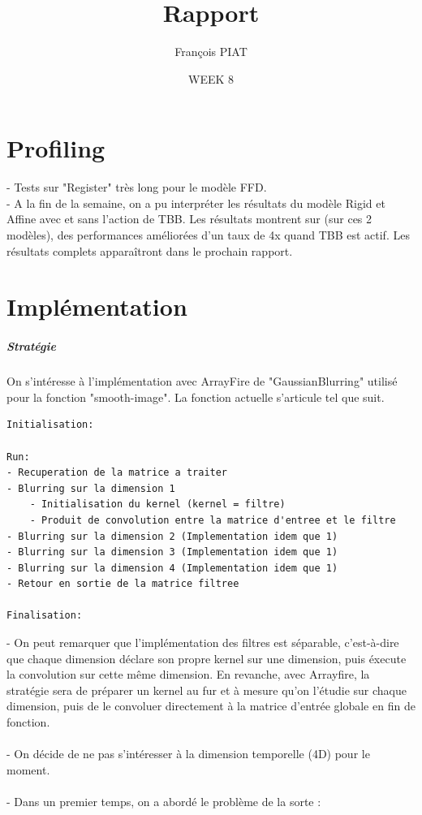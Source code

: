 \documentclass{report}
\title{Rapport}
\author{François PIAT}
\date{WEEK 8}
\begin{document}
\maketitle

\chapter*{Profiling}
- Tests sur "Register" très long pour le modèle FFD.\\
- A la fin de la semaine, on a pu interpréter les résultats du modèle Rigid et Affine avec et sans l'action de TBB. 
Les résultats montrent sur (sur ces 2 modèles), des performances améliorées d'un taux de 4x quand TBB est actif. Les résultats complets apparaîtront dans le prochain rapport.

\chapter*{Implémentation}	

\paragraph{Stratégie}
On s'intéresse à l'implémentation avec ArrayFire de "GaussianBlurring" utilisé pour la fonction "smooth-image". La fonction actuelle s'articule tel que suit.
\begin{lstlisting}
Initialisation:

Run:
- Recuperation de la matrice a traiter
- Blurring sur la dimension 1
	- Initialisation du kernel (kernel = filtre)
	- Produit de convolution entre la matrice d'entree et le filtre
- Blurring sur la dimension 2 (Implementation idem que 1)
- Blurring sur la dimension 3 (Implementation idem que 1)
- Blurring sur la dimension 4 (Implementation idem que 1)
- Retour en sortie de la matrice filtree

Finalisation:
\end{lstlisting}
- On peut remarquer que l'implémentation des filtres est séparable, c'est-à-dire que chaque dimension déclare son propre kernel sur une dimension, puis éxecute la convolution sur cette même dimension. En revanche,  avec Arrayfire, la stratégie sera de préparer un kernel au fur et à mesure qu'on l'étudie sur chaque dimension, puis de le convoluer directement à la matrice d'entrée globale en fin de fonction.
\\
\\
- On décide de ne pas s'intéresser à la dimension temporelle (4D) pour le moment.\\
\\
- Dans un premier temps, on a abordé le problème de la sorte :
\end{document}
